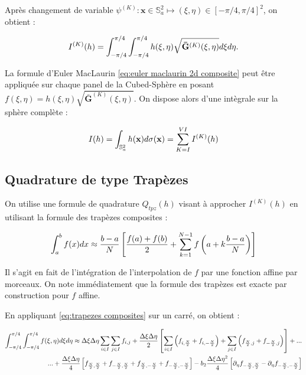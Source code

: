 Après changement de variable $\psi^{(K)} : \mathbf{x} \in \mathbb{S}_a^2 \mapsto (\xi, \eta) \in [-\pi/4, \pi/4]^2$, on obtient :

\begin{equation}
I^{(K)}(h) = \displaystyle\int_{-\pi/4}^{\pi/4}\displaystyle\int_{-\pi/4}^{\pi/4} h(\xi, \eta) \sqrt{\mathbf{\bar{G}}^{(K)}(\xi, \eta)} d \xi d \eta.
\end{equation}

La formule d'Euler MacLaurin \eqref{eq:euler maclaurin 2d composite} peut être appliquée sur chaque panel de la Cubed-Sphère en posant $f(\xi,\eta)=h(\xi,\eta)\sqrt{\mathbf{\bar{G}}^{(K)}(\xi, \eta)}$. On dispose alors d'une intègrale sur la sphère complète :

\begin{equation}
I(h)=\displaystyle\int_{\mathbb{S}_a^2} h(\mathbf{x})d\sigma(\mathbf{x}) = \displaystyle\sum\limits_{K = I}^{VI} I^{(K)}(h)
\end{equation}

\subsection{Quadrature de type Trapèzes}

On utilise une formule de quadrature $Q_{tpz}(h)$ visant à approcher $I^{(K)}(h)$ en utilisant la formule des trapèzes composites :

\begin{equation}
\displaystyle\int_{a}^b f(x)dx \approx \dfrac{b-a}{N} \left[ \dfrac{f(a)+f(b)}{2} + \displaystyle\sum\limits_{k=1}^{N-1} f\left( a+k \dfrac{b-a}{N} \right) \right]
\label{eq:trapezes composites}
\end{equation}

Il s'agit en fait de l'intégration de l'interpolation de $f$ par une fonction affine par morceaux. On note immédiatement que la formule des trapèzes est exacte par construction pour $f$ affine.

En appliquant \eqref{eq:trapezes composites} sur un carré, on obtient :

\begin{equation}
\begin{split}
\displaystyle\int_{-\pi/4}^{\pi/4} \displaystyle\int_{-\pi/4}^{\pi/4} f(\xi,\eta)d\xi d\eta \approx \Delta \xi \Delta \eta \displaystyle\sum\limits_{i \in I} \displaystyle\sum\limits_{j \in I} f_{i,j} +  \dfrac{\Delta \xi \Delta \eta}{2} \left[ \displaystyle\sum\limits_{i \in I} \left(  f_{i,\frac{N}{2}} + f_{i,-\frac{N}{2}}  \right) + \displaystyle\sum\limits_{j \in I} \left(  f_{\frac{N}{2},j} + f_{-\frac{N}{2},j}  \right) \right] + ... \\
...+ \dfrac{\Delta \xi \Delta \eta}{4} \left[ f_{\frac{N}{2},\frac{N}{2}}+f_{-\frac{N}{2},\frac{N}{2}}+f_{\frac{N}{2},-\frac{N}{2}}+f_{-\frac{N}{2},-\frac{N}{2}} \right]- b_2 \dfrac{\Delta \xi \Delta \eta^2}{4} \left[ \partial_{\eta} f_{-\frac{N}{2},\frac{N}{2}} - \partial_{\eta} f_{-\frac{N}{2},-\frac{N}{2}} \right]
\end{split}
\label{eq:trapezes 2d composite}
\end{equation}

